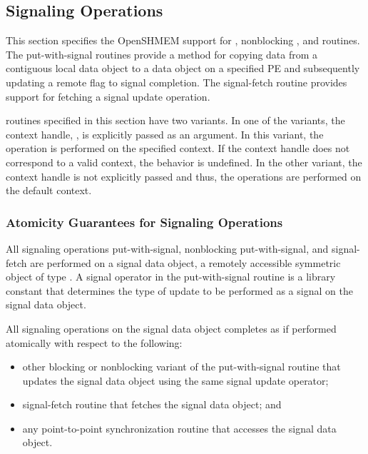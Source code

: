 \documentclass[10pt]{book}
\begin{document}
\label{subsec:shmem_atomic_fetch_and_nbi}


\label{subsec:shmem_atomic_fetch_or_nbi}


\label{subsec:shmem_atomic_fetch_xor_nbi}




\subsection{Signaling Operations}\label{sec:shmem_signal}
This section specifies the OpenSHMEM support for ,
nonblocking , and  routines. The
put-with-signal routines provide a method for copying data from a contiguous
local data object to a data object on a specified \ac{PE} and subsequently
updating a remote flag to signal completion. The signal-fetch routine provides
support for fetching a signal update operation.

\openshmem {} routines specified in this section have two
variants. In one of the variants, the context handle, , is explicitly
passed as an argument. In this variant, the operation is performed on the
specified context. If the context handle  does not correspond to a
valid context, the behavior is undefined. In the other variant, the context
handle is not explicitly passed and thus, the operations are performed on the
default context.

\subsubsection{Atomicity Guarantees for Signaling Operations}
\label{subsec:signal_atomicity}
All signaling operations put-with-signal, nonblocking put-with-signal, and
signal-fetch are performed on a signal data object, a remotely accessible
symmetric object of type . A signal operator in the
put-with-signal routine is a \openshmem library constant that determines the
type of update to be performed as a signal on the signal data object.

All signaling operations on the signal data object completes as if performed
atomically with respect to the following:
\begin{itemize}
    \item other blocking or nonblocking variant of the put-with-signal routine
    that updates the signal data object using the same signal update operator;
    \item signal-fetch routine that fetches the signal data object; and
    \item any point-to-point synchronization routine that accesses the signal
    data object.
\end{itemize}
\end{document}
